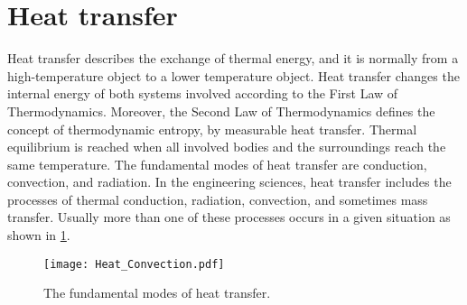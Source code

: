 \section{Heat transfer}
\noindent
Heat transfer describes the exchange of thermal energy, and it is normally from a high-temperature object to a lower temperature object.
Heat transfer changes the internal energy of both systems involved according to the First Law of Thermodynamics.
Moreover, the Second Law of Thermodynamics defines the concept of thermodynamic entropy, by measurable heat transfer.
Thermal equilibrium is reached when all involved bodies and the surroundings reach the same temperature.
The fundamental modes of heat transfer are conduction, convection, and radiation.
In the engineering sciences, heat transfer includes the processes of thermal conduction, radiation, convection, and sometimes mass transfer.
Usually more than one of these processes occurs in a given situation as shown in \ref{Fig:HeatTransfer}.
\begin{figure}[!htp]
	\centering
	\texttt{[image: Heat\_Convection.pdf]}
	\caption{The fundamental modes of heat transfer.}
	\label{Fig:HeatTransfer}
\end{figure}

